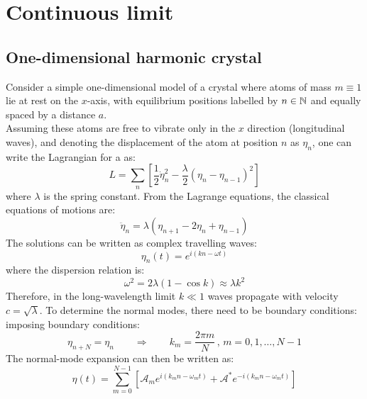 
\section{Continuous limit}

\subsection{One-dimensional harmonic crystal}

Consider a simple one-dimensional model of a crystal where atoms of mass $ m \equiv 1 $ lie at rest on the $ x $-axis, with equilibrium positions labelled by $ n \in \mathbb{N} $ and equally spaced by a distance $ a $.\\
Assuming these atoms are free to vibrate only in the $ x $ direction (longitudinal waves), and denoting the displacement of the atom at position $ n $ as $ \eta_n $, one can write the Lagrangian for a  as:
\begin{equation}
  L = \sum_{n} \left[ \frac{1}{2} \dot{\eta}_n^2 - \frac{\lambda}{2} \left( \eta_n - \eta_{n-1} \right)^2 \right]
  \label{eq:first-lag}
\end{equation}
where $ \lambda $ is the spring constant. From the Lagrange equations, the classical equations of motions are:
\begin{equation}
  \ddot{\eta}_n = \lambda \left( \eta_{n+1} - 2 \eta_n + \eta_{n-1} \right)
\end{equation}
The solutions can be written as complex travelling waves:
\begin{equation}
  \eta_n (t) = e^{i \left( k n - \omega t \right)}
\end{equation}
where the dispersion relation is:
\begin{equation}
  \omega^2 = 2\lambda \left( 1 - \cos k \right) \approx \lambda k^2
\end{equation}
Therefore, in the long-wavelength limit $ k \ll 1 $ waves propagate with velocity $ c = \sqrt{\lambda} $. To determine the normal modes, there need to be boundary conditions: imposing boundary conditions:
\begin{equation}
  \eta_{n + N} = \eta_n \qquad \Rightarrow \qquad k_m = \frac{2\pi m}{N} \,,\, m = 0, 1, \dots, N - 1
\end{equation}
The normal-mode expansion can then be written as:
\begin{equation}
  \eta (t) = \sum_{m = 0}^{N - 1} \left[ \mathcal{A}_m e^{i \left( k_m n - \omega_m t \right)} + \mathcal{A}^* e^{-i \left( k_m n - \omega_m t \right)} \right]
  \label{eq:first-exp}
\end{equation}
